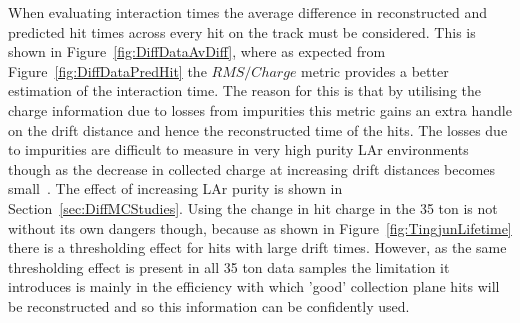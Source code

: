 When evaluating interaction times the average difference in reconstructed and predicted hit times across every hit on the track must be considered. This is shown in Figure~\ref{fig:DiffDataAvDiff}, where as expected from Figure~\ref{fig:DiffDataPredHit} the $RMS/Charge$ metric provides a better estimation of the interaction time. The reason for this is that by utilising the charge information due to losses from impurities this metric gains an extra handle on the drift distance and hence the reconstructed time of the hits. The losses due to impurities are difficult to measure in very high purity LAr environments though as the decrease in collected charge at increasing drift distances becomes small~\citep{LongBo}. The effect of increasing LAr purity is shown in Section~\ref{sec:DiffMCStudies}. Using the change in hit charge in the 35 ton is not without its own dangers though, because as shown in Figure~\ref{fig:TingjunLifetime} there is a thresholding effect for hits with large drift times. However, as the same thresholding effect is present in all 35 ton data samples the limitation it introduces is mainly in the efficiency with which 'good' collection plane hits will be reconstructed and so this information can be confidently used. \\

